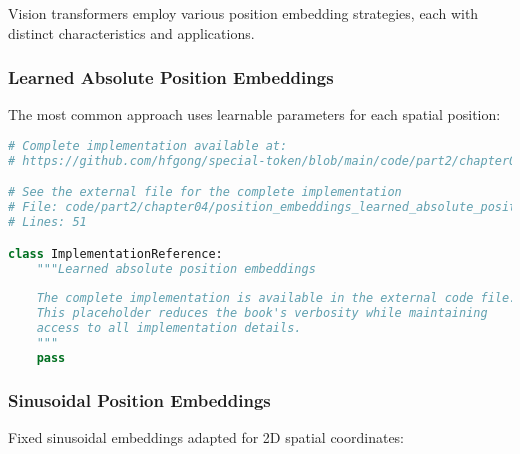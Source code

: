 Vision transformers employ various position embedding strategies, each with distinct characteristics and applications.

\subsubsection{Learned Absolute Position Embeddings}

The most common approach uses learnable parameters for each spatial position:

\begin{lstlisting}[language=Python, caption={Learned absolute position embeddings}]
# Complete implementation available at:
# https://github.com/hfgong/special-token/blob/main/code/part2/chapter04/position_embeddings_learned_absolute_position_embe.py

# See the external file for the complete implementation
# File: code/part2/chapter04/position_embeddings_learned_absolute_position_embe.py
# Lines: 51

class ImplementationReference:
    """Learned absolute position embeddings
    
    The complete implementation is available in the external code file.
    This placeholder reduces the book's verbosity while maintaining
    access to all implementation details.
    """
    pass
\end{lstlisting}

\subsubsection{Sinusoidal Position Embeddings}

Fixed sinusoidal embeddings adapted for 2D spatial coordinates:

